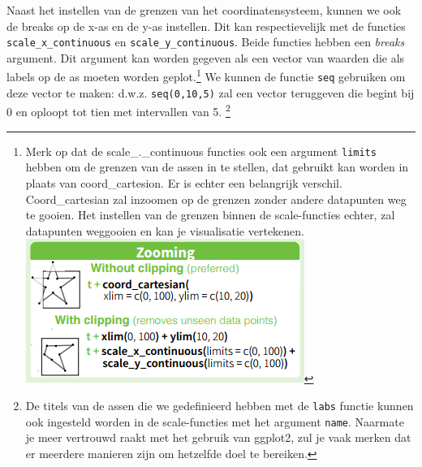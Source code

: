 \documentclass[]{tufte-book}
\begin{document}
Naast het instellen van de grenzen van het coordinatensysteem, kunnen we ook de breaks op de x-as en de y-as instellen. Dit kan respectievelijk met de functies \texttt{scale\_x\_continuous} en \texttt{scale\_y\_continuous}. Beide functies hebben een \emph{breaks} argument. Dit argument kan worden gegeven als een vector van waarden die als labels op de as moeten worden geplot.\footnote{Merk op dat de scale\_.\_continuous functies ook een argument \texttt{limits} hebben om de grenzen van de assen in te stellen, dat gebruikt kan worden in plaats van coord\_cartesion. Er is echter een belangrijk verschil. Coord\_cartesian zal inzoomen op de grenzen zonder andere datapunten weg te gooien. Het instellen van de grenzen binnen de scale-functies echter, zal datapunten weggooien en kan je visualisatie vertekenen. \includegraphics{images/zoom.png}} We kunnen de functie \texttt{seq} gebruiken om deze vector te maken: d.w.z. \texttt{seq(0,10,5)} zal een vector teruggeven die begint bij 0 en oploopt tot tien met intervallen van 5. \footnote{De titels van de assen die we gedefinieerd hebben met de \texttt{labs} functie kunnen ook ingesteld worden in de scale-functies met het argument \texttt{name}. Naarmate je meer vertrouwd raakt met het gebruik van ggplot2, zul je vaak merken dat er meerdere manieren zijn om hetzelfde doel te bereiken.}
\end{document}

